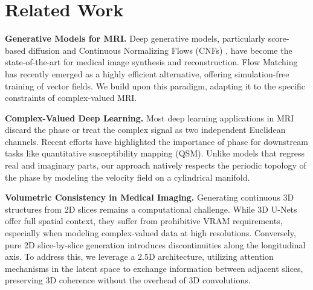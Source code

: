 \section{Related Work}
\label{sec:related}

\textbf{Generative Models for MRI.} 
Deep generative models, particularly score-based diffusion \cite{song2020score} and Continuous Normalizing Flows (CNFs) \cite{lipman2022flow}, have become the state-of-the-art for medical image synthesis and reconstruction. Flow Matching has recently emerged as a highly efficient alternative, offering simulation-free training of vector fields. We build upon this paradigm, adapting it to the specific constraints of complex-valued MRI.

\textbf{Complex-Valued Deep Learning.} 
Most deep learning applications in MRI discard the phase or treat the complex signal as two independent Euclidean channels. Recent efforts have highlighted the importance of phase for downstream tasks like quantitative susceptibility mapping (QSM). Unlike models that regress real and imaginary parts, our approach natively respects the periodic topology of the phase by modeling the velocity field on a cylindrical manifold.

\textbf{Volumetric Consistency in Medical Imaging.} 
Generating continuous 3D structures from 2D slices remains a computational challenge. While 3D U-Nets offer full spatial context, they suffer from prohibitive VRAM requirements, especially when modeling complex-valued data at high resolutions. Conversely, pure 2D slice-by-slice generation introduces discontinuities along the longitudinal axis. To address this, we leverage a 2.5D architecture, utilizing attention mechanisms in the latent space to exchange information between adjacent slices, preserving 3D coherence without the overhead of 3D convolutions.
